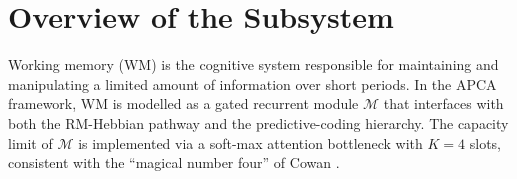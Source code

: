 \section{Overview of the Subsystem}

Working memory (WM) is the cognitive system responsible for maintaining and manipulating
a limited amount of information over short periods.  In the APCA framework, WM is
modelled as a gated recurrent module $\mathcal{M}$ that interfaces with both the
RM-Hebbian pathway and the predictive-coding hierarchy.  The capacity limit of
$\mathcal{M}$ is implemented via a soft-max attention bottleneck with $K = 4$ slots,
consistent with the ``magical number four'' of Cowan \cite{cowan2001}.
